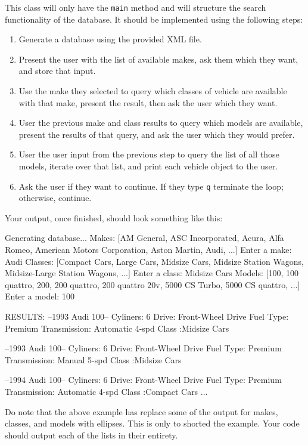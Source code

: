This class will only have the \lstinline|main| method and will structure the
search functionality of the database. It should be implemented using the
following steps:
\begin{enumerate}
    \item Generate a database using the provided XML file.
    \item Present the user with the list of available makes, ask them which they want, and store that input.
    \item Use the make they selected to query which classes of vehicle are available with that make, present the result, then ask the user which they want.
    \item User the previous make and class results to query which models are available, present the results of that query, and ask the user which they would prefer.
    \item User the user input from the previous step to query the list of all those models, iterate over that list, and print each vehicle object to the user.
    \item Ask the user if they want to continue. If they type \lstinline|q| terminate the loop; otherwise, continue.
\end{enumerate}
Your output, once finished, should look something like this:

\begin{shell}
Generating database...
Makes: [AM General, ASC Incorporated, Acura, Alfa Romeo, American Motors Corporation, Aston Martin, Audi, ...]
Enter a make: Audi
Classes: [Compact Cars, Large Cars, Midsize Cars, Midsize Station Wagons, Midsize-Large Station Wagons, ...]
Enter a class: Midsize Cars
Models: [100, 100 quattro, 200, 200 quattro, 200 quattro 20v, 5000 CS Turbo, 5000 CS quattro, ...]
Enter a model: 100

RESULTS:
--1993 Audi 100--
Cyliners: 6
Drive: Front-Wheel Drive
Fuel Type: Premium
Transmission: Automatic 4-spd
Class :Midsize Cars

--1993 Audi 100--
Cyliners: 6
Drive: Front-Wheel Drive
Fuel Type: Premium
Transmission: Manual 5-spd
Class :Midsize Cars

--1994 Audi 100--
Cyliners: 6
Drive: Front-Wheel Drive
Fuel Type: Premium
Transmission: Automatic 4-spd
Class :Compact Cars
...
\end{shell}

Do note that the above example has replace some of the output for makes,
classes, and models with ellipses. This is only to shorted the example. Your
code should output each of the lists in their entirety.
